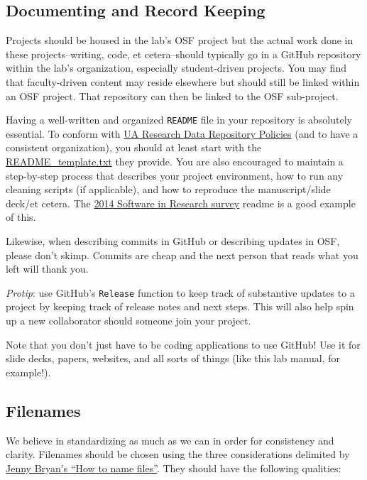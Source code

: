 \documentclass[]{tufte-book}
\begin{document}
\hypertarget{documenting}{%
\subsection{Documenting and Record Keeping}\label{documenting}}

Projects should be housed in the lab's OSF project but the actual work done in these projects--writing, code, et cetera--should typically go in a GitHub repository within the lab's organization, especially student-driven projects. You may find that faculty-driven content may reside elsewhere but should still be linked within an OSF project. That repository can then be linked to the OSF sub-project.

Having a well-written and organized \texttt{README} file in your repository is absolutely essential. To conform with \href{https://data.library.arizona.edu/data-management/best-practices/data-documentation-readme-metadata}{UA Research Data Repository Policies} (and to have a consistent organization), you should at least start with the \href{https://osf.io/sj8xv/}{README\_template.txt} they provide. You are also encouraged to maintain a step-by-step process that describes your project environment, how to run any cleaning scripts (if applicable), and how to reproduce the manuscript/slide deck/et cetera. The \href{https://github.com/softwaresaved/software_in_research_survey_2014/blob/1.0/README.md}{2014 Software in Research survey} readme is a good example of this.

Likewise, when describing commits in GitHub or describing updates in OSF, please don't skimp. Commits are cheap and the next person that reads what you left will thank you.

\emph{Protip}: use GitHub's \texttt{Release} function to keep track of substantive updates to a project by keeping track of release notes and next steps. This will also help spin up a new collaborator should someone join your project.

Note that you don't just have to be coding applications to use GitHub! Use it for slide decks, papers, websites, and all sorts of things (like this lab manual, for example!).

\hypertarget{filenames}{%
\subsection{Filenames}\label{filenames}}

We believe in standardizing as much as we can in order for consistency and clarity. Filenames should be chosen using the three considerations delimited by \href{https://speakerdeck.com/jennybc/how-to-name-files?slide=4}{Jenny Bryan's ``How to name files''}. They should have the following qualities:
\end{document}
